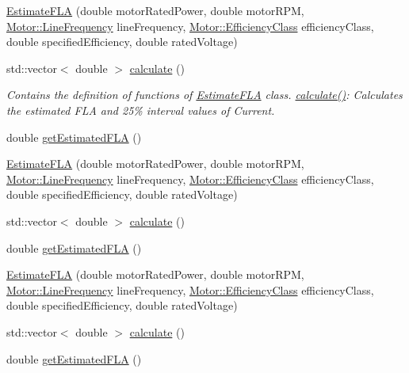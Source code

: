 \begin{DoxyCompactItemize}
\item 
\hyperlink{class_estimate_f_l_a_ace098c4a684eb4926b20322cf65da32d}{Estimate\+F\+LA} (double motor\+Rated\+Power, double motor\+R\+PM, \hyperlink{class_motor_acee1bdf1b684ad36cb80dc2829d9fcee}{Motor\+::\+Line\+Frequency} line\+Frequency, \hyperlink{class_motor_afa022971ae062406a9f588c601673d4e}{Motor\+::\+Efficiency\+Class} efficiency\+Class, double specified\+Efficiency, double rated\+Voltage)
\item 
std\+::vector$<$ double $>$ \hyperlink{class_estimate_f_l_a_ae8601d58dbeab855ade2e3f06ccf6cec}{calculate} ()
\begin{DoxyCompactList}\small\item\em Contains the definition of functions of \hyperlink{class_estimate_f_l_a}{Estimate\+F\+LA} class. \hyperlink{class_estimate_f_l_a_ae8601d58dbeab855ade2e3f06ccf6cec}{calculate()}\+: Calculates the estimated F\+LA and 25\% interval values of Current. \end{DoxyCompactList}\item 
double \hyperlink{class_estimate_f_l_a_a84bebf788da566929b85d3deb8fd9755}{get\+Estimated\+F\+LA} ()
\item 
\hyperlink{class_estimate_f_l_a_ace098c4a684eb4926b20322cf65da32d}{Estimate\+F\+LA} (double motor\+Rated\+Power, double motor\+R\+PM, \hyperlink{class_motor_acee1bdf1b684ad36cb80dc2829d9fcee}{Motor\+::\+Line\+Frequency} line\+Frequency, \hyperlink{class_motor_afa022971ae062406a9f588c601673d4e}{Motor\+::\+Efficiency\+Class} efficiency\+Class, double specified\+Efficiency, double rated\+Voltage)
\item 
std\+::vector$<$ double $>$ \hyperlink{class_estimate_f_l_a_aca54dc9982635255099529bbc36c2982}{calculate} ()
\item 
double \hyperlink{class_estimate_f_l_a_a84bebf788da566929b85d3deb8fd9755}{get\+Estimated\+F\+LA} ()
\item 
\hyperlink{class_estimate_f_l_a_ace098c4a684eb4926b20322cf65da32d}{Estimate\+F\+LA} (double motor\+Rated\+Power, double motor\+R\+PM, \hyperlink{class_motor_acee1bdf1b684ad36cb80dc2829d9fcee}{Motor\+::\+Line\+Frequency} line\+Frequency, \hyperlink{class_motor_afa022971ae062406a9f588c601673d4e}{Motor\+::\+Efficiency\+Class} efficiency\+Class, double specified\+Efficiency, double rated\+Voltage)
\item 
std\+::vector$<$ double $>$ \hyperlink{class_estimate_f_l_a_aca54dc9982635255099529bbc36c2982}{calculate} ()
\item 
double \hyperlink{class_estimate_f_l_a_a84bebf788da566929b85d3deb8fd9755}{get\+Estimated\+F\+LA} ()
\end{DoxyCompactItemize}


